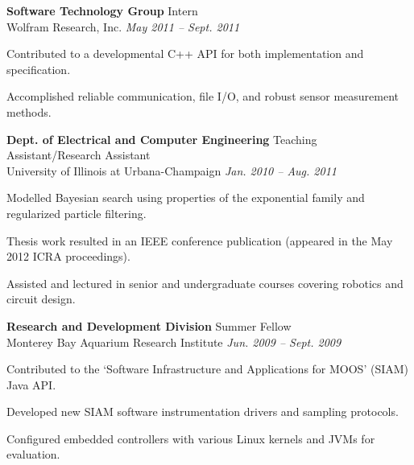 \documentclass[margin, line]{resume}
\begin{document}
\begin{resume}
    \textbf{Software Technology Group} \hfill Intern\\  
    Wolfram Research, Inc. \hfill \textsl{May 2011 -- Sept. 2011} \\
    \vspace{ -2 mm}
    \begin{list2}
        \item Contributed to a developmental C++ API for both implementation and specification.
	 \item Accomplished reliable communication, file I/O, and robust sensor measurement methods. 
    \end{list2}\vspace{-2mm}

    \textbf{Dept. of Electrical and Computer Engineering} \hfill Teaching Assistant/Research Assistant \\  
    University of Illinois at Urbana-Champaign \hfill \textsl{Jan. 2010 -- Aug. 2011} \\
    \vspace{ -2 mm}
    \begin{list2}
        \item Modelled Bayesian search using properties of the exponential family and regularized particle filtering.
	 \item Thesis work resulted in an IEEE conference publication (appeared in the May 2012 ICRA proceedings).  
        \item Assisted and lectured in senior and undergraduate courses covering robotics and circuit design.
    \end{list2}\vspace{-2mm}

    \textbf{Research and Development Division} \hfill Summer Fellow \\ 
    Monterey Bay Aquarium Research Institute \hfill \textsl{Jun. 2009 -- Sept. 2009}  \\
    \vspace{ -2 mm}	
    \begin{list2}
	\item Contributed to the `Software Infrastructure and Applications for MOOS' (SIAM) Java API. 
	\item Developed new SIAM software instrumentation drivers and sampling protocols.
	\item Configured embedded controllers with various Linux kernels and JVMs for evaluation.
    \end{list2}\vspace{-2mm}
    

\end{resume}
\end{document}
